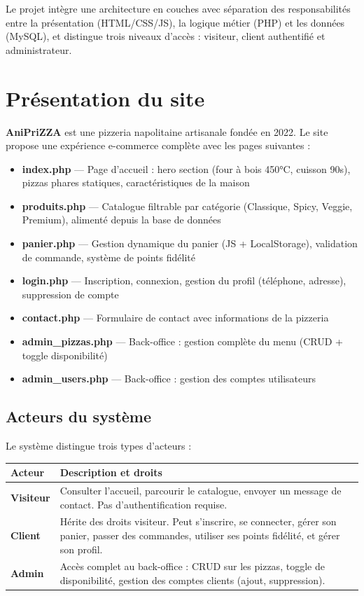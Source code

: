\documentclass[a4paper,12pt]{article}
\begin{document}
Le projet intègre une architecture en couches avec séparation des responsabilités entre la présentation (HTML/CSS/JS), la logique métier (PHP) et les données (MySQL), et distingue trois niveaux d'accès : visiteur, client authentifié et administrateur.

\section{Présentation du site}

\textbf{AniPriZZA} est une pizzeria napolitaine artisanale fondée en 2022. Le site propose une expérience e-commerce complète avec les pages suivantes :

\begin{itemize}
    \item \textbf{index.php} --- Page d'accueil : hero section (four à bois 450°C, cuisson 90s), pizzas phares statiques, caractéristiques de la maison
    \item \textbf{produits.php} --- Catalogue filtrable par catégorie (Classique, Spicy, Veggie, Premium), alimenté depuis la base de données
    \item \textbf{panier.php} --- Gestion dynamique du panier (JS + LocalStorage), validation de commande, système de points fidélité
    \item \textbf{login.php} --- Inscription, connexion, gestion du profil (téléphone, adresse), suppression de compte
    \item \textbf{contact.php} --- Formulaire de contact avec informations de la pizzeria
    \item \textbf{admin\_pizzas.php} --- Back-office : gestion complète du menu (CRUD + toggle disponibilité)
    \item \textbf{admin\_users.php} --- Back-office : gestion des comptes utilisateurs
\end{itemize}

\subsection{Acteurs du système}

Le système distingue trois types d'acteurs :

\begin{center}
\renewcommand{\arraystretch}{1.4}
\begin{tabular}{|>{\bfseries}p{2.5cm}|p{10cm}|}
\hline
Acteur & Description et droits \\
\hline
Visiteur & Consulter l'accueil, parcourir le catalogue, envoyer un message de contact. Pas d'authentification requise. \\
\hline
Client & Hérite des droits visiteur. Peut s'inscrire, se connecter, gérer son panier, passer des commandes, utiliser ses points fidélité, et gérer son profil. \\
\hline
Admin & Accès complet au back-office : CRUD sur les pizzas, toggle de disponibilité, gestion des comptes clients (ajout, suppression). \\
\hline
\end{tabular}
\end{center}
\end{document}
